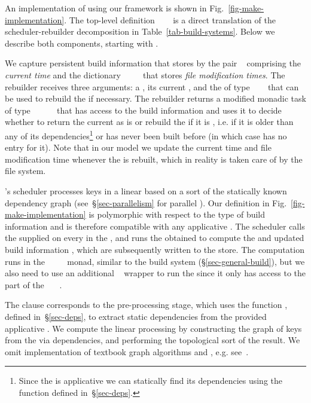 An implementation of \Make using our framework is shown in
Fig.~\ref{fig-make-implementation}. The top-level definition
~\hs{=}~~ is a direct translation
of the scheduler-rebuilder decomposition in Table~\ref{tab-build-systems}. Below
we describe both components, starting with .

We capture persistent build information that \Make stores by the pair
~ comprising the \emph{current time}  and the
dictionary ~\hs{::}~~~ that stores \emph{file
modification times}. The rebuilder receives three arguments: a , its
current , and the  of type
~~~ that can be used to rebuild the
 if necessary. The rebuilder returns a modified monadic task of type
~~~~~ that has
access to the build information and uses it to decide whether to return the
current  as is or rebuild the  if it is , i.e.
if it is older than any of its dependencies\footnote{Since the  is
applicative we can statically find its dependencies using the function
 defined in~\S\ref{sec-deps}.} or has never been built before
(in which case  has no entry for it). Note that in our model we
update the current time and file modification time whenever the  is
rebuilt, which in reality is taken care of by the file system.

\Make's scheduler processes keys in a linear  based on a
 sort of the statically known dependency graph
(see~\S\ref{sec-parallelism} for parallel \Make). Our definition in
Fig.~\ref{fig-make-implementation} is polymorphic with respect to the type of
build information  and is therefore compatible with any applicative
. The scheduler calls the supplied  on every
 in the , and runs the obtained  to compute the
 and updated build information , which are subsequently
written to the store. The computation runs in the
~~~~ monad, similar to the 
build system (\S\ref{sec-general-build}), but we also need to use an additional
~ wrapper to run the  since it only has access to
the  part of the ~~~.

The  clause corresponds to the pre-processing stage, which uses the
function , defined in~\S\ref{sec-deps}, to extract static
dependencies from the provided applicative . We compute the linear
processing  by constructing the graph of keys  from the
 via dependencies, and performing the topological sort of the result.
We omit implementation of textbook graph algorithms
 and , e.g. see~\cite{cormen2001introduction}.

